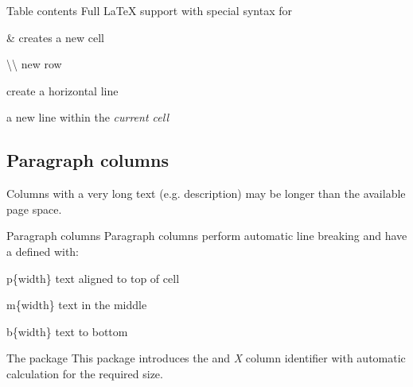 \begin{frame}
	\begin{block}{Table contents}
		Full {\LaTeX} support with special syntax for
		\begin{mdescription}
			\item[\&] creates a new cell
			\item[\textbackslash\textbackslash{}] new row
			\item[\lcs{hline}] create a horizontal line
			\item[\lcs{newline}] a new line within the \emph{current cell}
		\end{mdescription}
	\end{block}

\end{frame}

\subsection{Paragraph columns}
\begin{frame}
	
	Columns with a very long text (e.g. description) may be longer
	than the available page space.
	

\end{frame}
\begin{frame}
	\begin{block}{Paragraph columns}
		Paragraph columns perform automatic line breaking and have a defined
		with:
		\begin{mdescription}
			\item[p\{width\}] text aligned to top of cell
			\item[m\{width\}] text in the middle
			\item[b\{width\}] text to bottom
		\end{mdescription}
	\end{block}
\end{frame}
\begin{frame}
	\begin{block}{The  package}
		This package introduces the  and \emph{X} column identifier with automatic
		calculation for the required size.
	\end{block}
\end{frame}

